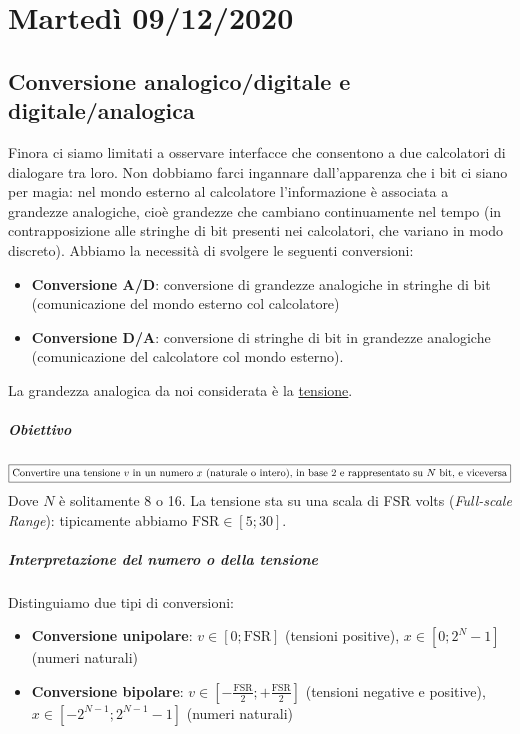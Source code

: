 \documentclass[11pt]{report}
\begin{document}
\chapter{Martedì 09/12/2020}
\section{Conversione analogico/digitale e digitale/analogica}
Finora ci siamo limitati a osservare interfacce che consentono a due calcolatori di dialogare tra loro. Non dobbiamo farci ingannare dall'apparenza che i bit ci siano per magia: nel mondo esterno al calcolatore l'informazione è associata a grandezze analogiche, cioè grandezze che cambiano continuamente nel tempo (in contrapposizione alle stringhe di bit presenti nei calcolatori, che variano in modo discreto).  Abbiamo la necessità di svolgere le seguenti conversioni:
\begin{itemize}
\item \textbf{Conversione A/D}: conversione di grandezze analogiche in stringhe di bit (comunicazione del mondo esterno col calcolatore)
\item \textbf{Conversione D/A}: conversione di stringhe di bit in grandezze analogiche (comunicazione del calcolatore col mondo esterno).
\end{itemize}
La grandezza analogica da noi considerata è la \underline{tensione}.
\paragraph{Obiettivo}
\[\boxed{\text{\small Convertire una tensione $v$ in un numero $x$ (naturale o intero), in base 2 e rappresentato su $N$ bit, e viceversa}}\] 
Dove $N$ è solitamente 8 o 16. La tensione sta su una scala di FSR volts (\emph{Full-scale Range}): tipicamente abbiamo $\text{FSR} \in [5;30]$.
\paragraph{Interpretazione del numero o della tensione} Distinguiamo due tipi di conversioni:
\begin{itemize}
\item \textbf{Conversione unipolare}: $v \in [0;\text{FSR}]$ (tensioni positive), $x \in [0;2^N-1]$ (numeri naturali)
\item \textbf{Conversione bipolare}: $v \in \left[-\frac{\text{FSR}}{2};+\frac{\text{FSR}}{2}\right]$ (tensioni negative e positive),\\$x \in [-2^{N-1};2^{N-1}-1]$ (numeri naturali)
\end{itemize}
\end{document}
